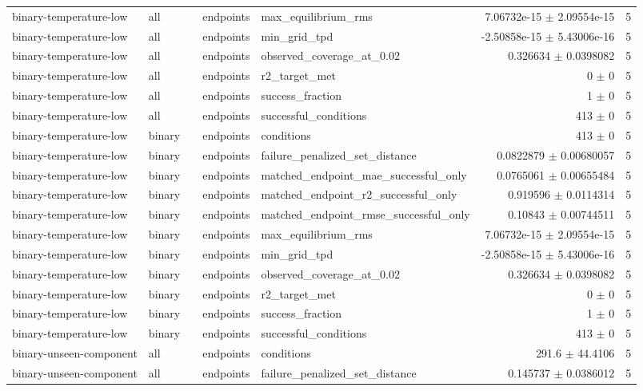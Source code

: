 \begin{tabular}{lllllrr}
binary-temperature-low & all &  & endpoints & max_equilibrium_rms & 7.06732e-15 $\pm$ 2.09554e-15 & 5 \\
binary-temperature-low & all &  & endpoints & min_grid_tpd & -2.50858e-15 $\pm$ 5.43006e-16 & 5 \\
binary-temperature-low & all &  & endpoints & observed_coverage_at_0.02 & 0.326634 $\pm$ 0.0398082 & 5 \\
binary-temperature-low & all &  & endpoints & r2_target_met & 0 $\pm$ 0 & 5 \\
binary-temperature-low & all &  & endpoints & success_fraction & 1 $\pm$ 0 & 5 \\
binary-temperature-low & all &  & endpoints & successful_conditions & 413 $\pm$ 0 & 5 \\
binary-temperature-low & binary &  & endpoints & conditions & 413 $\pm$ 0 & 5 \\
binary-temperature-low & binary &  & endpoints & failure_penalized_set_distance & 0.0822879 $\pm$ 0.00680057 & 5 \\
binary-temperature-low & binary &  & endpoints & matched_endpoint_mae_successful_only & 0.0765061 $\pm$ 0.00655484 & 5 \\
binary-temperature-low & binary &  & endpoints & matched_endpoint_r2_successful_only & 0.919596 $\pm$ 0.0114314 & 5 \\
binary-temperature-low & binary &  & endpoints & matched_endpoint_rmse_successful_only & 0.10843 $\pm$ 0.00744511 & 5 \\
binary-temperature-low & binary &  & endpoints & max_equilibrium_rms & 7.06732e-15 $\pm$ 2.09554e-15 & 5 \\
binary-temperature-low & binary &  & endpoints & min_grid_tpd & -2.50858e-15 $\pm$ 5.43006e-16 & 5 \\
binary-temperature-low & binary &  & endpoints & observed_coverage_at_0.02 & 0.326634 $\pm$ 0.0398082 & 5 \\
binary-temperature-low & binary &  & endpoints & r2_target_met & 0 $\pm$ 0 & 5 \\
binary-temperature-low & binary &  & endpoints & success_fraction & 1 $\pm$ 0 & 5 \\
binary-temperature-low & binary &  & endpoints & successful_conditions & 413 $\pm$ 0 & 5 \\
binary-unseen-component & all &  & endpoints & conditions & 291.6 $\pm$ 44.4106 & 5 \\
binary-unseen-component & all &  & endpoints & failure_penalized_set_distance & 0.145737 $\pm$ 0.0386012 & 5 \\

\end{tabular}
